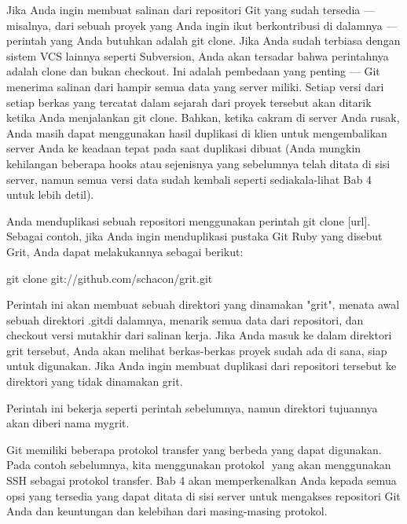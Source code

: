  \par
\noindent 
{\fontsize{14pt}{14pt}\selectfont Jika Anda ingin membuat salinan dari repositori Git yang sudah tersedia — misalnya, dari sebuah proyek yang Anda ingin ikut berkontribusi di dalamnya — perintah yang Anda butuhkan adalah $  $git clone. Jika Anda sudah terbiasa dengan sistem VCS lainnya seperti Subversion, Anda akan tersadar bahwa perintahnya adalah clone dan bukan checkout. Ini adalah pembedaan yang penting — Git menerima salinan dari hampir semua data yang server miliki. Setiap versi dari setiap berkas yang tercatat dalam sejarah dari proyek tersebut akan ditarik ketika Anda menjalankan $  $git clone. Bahkan, ketika cakram di server Anda rusak, Anda masih dapat menggunakan hasil duplikasi di klien untuk mengembalikan server Anda ke keadaan tepat pada saat duplikasi dibuat (Anda mungkin kehilangan beberapa hooks atau sejenisnya yang sebelumnya telah ditata di sisi server, namun semua versi data sudah kembali seperti sediakala-lihat Bab 4 untuk lebih detil). \\} \par
\noindent 
{\fontsize{14pt}{14pt}\selectfont Anda menduplikasi sebuah repositori menggunakan perintah $  $git clone [url]. Sebagai contoh, jika Anda ingin menduplikasi pustaka Git Ruby yang disebut Grit, Anda dapat melakukannya sebagai berikut: \\} \par
\noindent 
{\fontsize{14pt}{14pt}\selectfont git clone git://github.com/schacon/grit.git \\} \par
\noindent 
{\fontsize{14pt}{14pt}\selectfont Perintah ini akan membuat sebuah direktori yang dinamakan "grit", menata awal sebuah direktori $  $.gitdi dalamnya, menarik semua data dari repositori, dan $  $checkout $  $versi mutakhir dari salinan kerja. Jika Anda masuk ke dalam direktori $  $grit $  $tersebut, Anda akan melihat berkas-berkas proyek sudah ada di sana, siap untuk digunakan. Jika Anda ingin membuat duplikasi dari repositori tersebut ke direktori yang tidak dinamakan grit. \\} \par
\noindent 
{\fontsize{14pt}{14pt}\selectfont Perintah ini bekerja seperti perintah sebelumnya, namun direktori tujuannya akan diberi nama mygrit. \\} \par
\noindent 
{\fontsize{14pt}{14pt}\selectfont Git memiliki beberapa protokol transfer yang berbeda yang dapat digunakan. Pada contoh sebelumnya, kita menggunakan protokol $  $ yang akan menggunakan SSH sebagai protokol transfer. Bab 4 akan memperkenalkan Anda kepada semua opsi yang tersedia yang dapat ditata di sisi server untuk mengakses repositori Git Anda dan keuntungan dan kelebihan dari masing-masing protokol. \\} \par

